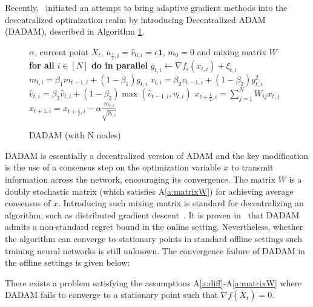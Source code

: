 \documentclass[anon,12pt]{colt2021} %
\begin{document}
Recently,~\cite{nazari2019dadam} initiated an attempt to bring adaptive gradient methods into the decentralized optimization realm by introducing Decentralized ADAM (DADAM), described in Algorithm \ref{alg: dadam}.
\begin{figure}\vspace{-0.8cm}
\begin{minipage}{\linewidth}
\begin{algorithm}[H]
	\caption{DADAM (with N nodes)}
	\label{alg: dadam}
	\begin{algorithmic}[1]
		 $\alpha$, current point $X_t$, $u_{\frac{1}{2},i} = \hat v_{0,i} = \epsilon \mathbf{1}$, $m_0=0$ and mixing matrix $W$
		\STATE \textbf{for all }$i \in [N]$ \textbf{do in parallel}
		\STATE \quad $g_{t,i}  \leftarrow \nabla f_i(x_{t,i}) + \xi_{t,i}$
		\STATE \quad $m_{t,i} = \beta_1 m_{t-1,i} + (1-\beta_1) g_{t,i}$ 
		\STATE \quad $v_{t,i} = \beta_2 v_{t-1,i}+(1-\beta_2)g_{t,i}^2$
		\STATE \quad $\hat v_{t,i} = \beta_3 \hat v_{t,i} + (1-\beta_3) \max(\hat v_{t-1,i},v_{t,i})$
		\STATE \quad $x_{t+\frac{1}{2},i} = \sum_{j=1}^N W_{ij}x_{t,j}$
		\STATE \quad $x_{t+1,i} = x_{t+\frac{1}{2},i} - \alpha \frac{m_{t,i}}{\sqrt{\hat v_{t,i}}}$
		\ENDFOR
	\end{algorithmic}
\end{algorithm}
\end{minipage}
\end{figure}
DADAM is essentially a decentralized version of ADAM and the key modification is the use of a consensus step on the optimization variable $x$ to transmit information across the network, encouraging its convergence. The matrix $W$ is a doubly stochastic matrix (which satisfies A\ref{a:matrixW}) for achieving  average consensus of $x$. 
Introducing such mixing matrix is standard for decentralizing an algorithm, such as distributed gradient descent~\cite{nedic2009distributed, yuan2016convergence}. 
It is proven in~\cite{nazari2019dadam} that DADAM admits a non-standard regret bound in the online setting. Nevertheless, whether the algorithm can converge to stationary points in standard offline settings such training neural networks is still unknown.
The convergence failure of DADAM in the offline  settings is given below:




\begin{boxtheo}\label{thm: dadam_diverge}
There exists a problem satisfying the assumptions A\ref{a:diff}-A\ref{a:matrixW} where DADAM fails to converge to a stationary point such that $\nabla f(\bar X_t) = 0$.   
\end{boxtheo}
\end{document}
